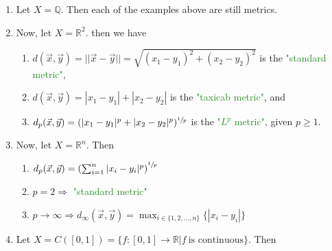 \documentclass{article}
\newcommand{\Divides}{\mathbin{\big|}}
\begin{document}
\begin{enumerate}
\begin{enumerate}
\begin{center}
\end{center}

This is known as the \textcolor{ForestGreen}{"discrete metric"}, which is actually a metric on any set~$X$.
    \end{enumerate}
    \item Let $X = \mathbb{Q}$. Then each of the examples above are still metrics.
    \item Now, let $X = \mathbb{R}^2$. then we have 
    \begin{enumerate}
        \item $d(\vec{x}, \vec{y}) = || \vec{x} - \vec{y}|| = \sqrt{(x_1-y_1)^2+(x_2-y_2)^2}$ is the \textcolor{ForestGreen}{"standard metric"},
        \item $d(\vec{x}, \vec{y}) = |x_1-y_1|+|x_2-y_2|$ is the \textcolor{ForestGreen}{"taxicab metric"}, and 
        \item $d_p(\vec{x}, \vec{y})=(|x_1-y_1|^p+|x_2-y_2|^p)^{\sfrac{1}{p}}$ is the \textcolor{ForestGreen}{"$L^p$ metric"}, given $p \geq 1$.
    \end{enumerate}
    \item Now, let $X=\mathbb{R}^n$. Then 
    \begin{enumerate}
        \item $d_p(\vec{x}, \vec{y})= \left(\sum_{i = 1}^n|x_i-y_i|^p \right)^{\sfrac{1}{p}}$
        \item $p = 2 \Longrightarrow $ \textcolor{ForestGreen}{"standard metric"}
        \item $p \longrightarrow \infty \Longrightarrow d_{\infty}(\vec{x},\vec{y}) = \max_{i \in \{1,2,\dots,n\}}\{{|x_i-y_i|}\}$
    \end{enumerate}
    \item Let $X = C([0,1]) = \{f:[0,1] \longrightarrow \mathbb{R} \Divides f \ \text{is continuous}\}$. Then 
    \begin{center}

\end{center}
\end{enumerate}
\end{document}
